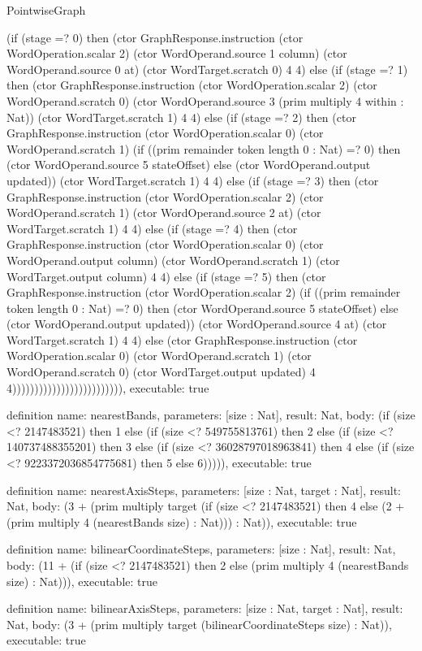 \begin{lexlean}{PointwiseGraph}
\begin{semanticmodule}
{      (if (stage =? 0) then (ctor GraphResponse.instruction (ctor WordOperation.scalar 2) (ctor WordOperand.source 1 column) (ctor WordOperand.source 0 at) (ctor WordTarget.scratch 0) 4 4) else (if (stage =? 1) then (ctor GraphResponse.instruction (ctor WordOperation.scalar 2) (ctor WordOperand.scratch 0) (ctor WordOperand.source 3 (prim multiply 4 within : Nat)) (ctor WordTarget.scratch 1) 4 4) else (if (stage =? 2) then (ctor GraphResponse.instruction (ctor WordOperation.scalar 0) (ctor WordOperand.scratch 1) (if ((prim remainder token length 0 : Nat) =? 0) then (ctor WordOperand.source 5 stateOffset) else (ctor WordOperand.output updated)) (ctor WordTarget.scratch 1) 4 4) else (if (stage =? 3) then (ctor GraphResponse.instruction (ctor WordOperation.scalar 2) (ctor WordOperand.scratch 1) (ctor WordOperand.source 2 at) (ctor WordTarget.scratch 1) 4 4) else (if (stage =? 4) then (ctor GraphResponse.instruction (ctor WordOperation.scalar 0) (ctor WordOperand.output column) (ctor WordOperand.scratch 1) (ctor WordTarget.output column) 4 4) else (if (stage =? 5) then (ctor GraphResponse.instruction (ctor WordOperation.scalar 2) (if ((prim remainder token length 0 : Nat) =? 0) then (ctor WordOperand.source 5 stateOffset) else (ctor WordOperand.output updated)) (ctor WordOperand.source 4 at) (ctor WordTarget.scratch 1) 4 4) else (ctor GraphResponse.instruction (ctor WordOperation.scalar 0) (ctor WordOperand.scratch 1) (ctor WordOperand.scratch 0) (ctor WordTarget.output updated) 4 4))))))))))))))))))))))))),
  executable: true
}

definition{
  name: nearestBands,
  parameters: [size : Nat],
  result: Nat,
  body: (if (size <? 2147483521) then 1 else (if (size <? 549755813761) then 2 else (if (size <? 140737488355201) then 3 else (if (size <? 36028797018963841) then 4 else (if (size <? 9223372036854775681) then 5 else 6))))),
  executable: true
}

definition{
  name: nearestAxisSteps,
  parameters: [size : Nat, target : Nat],
  result: Nat,
  body: (3 + (prim multiply target (if (size <? 2147483521) then 4 else (2 + (prim multiply 4 (nearestBands size) : Nat))) : Nat)),
  executable: true
}

definition{
  name: bilinearCoordinateSteps,
  parameters: [size : Nat],
  result: Nat,
  body: (11 + (if (size <? 2147483521) then 2 else (prim multiply 4 (nearestBands size) : Nat))),
  executable: true
}

definition{
  name: bilinearAxisSteps,
  parameters: [size : Nat, target : Nat],
  result: Nat,
  body: (3 + (prim multiply target (bilinearCoordinateSteps size) : Nat)),
  executable: true
}


\end{semanticmodule}
\end{lexlean}
